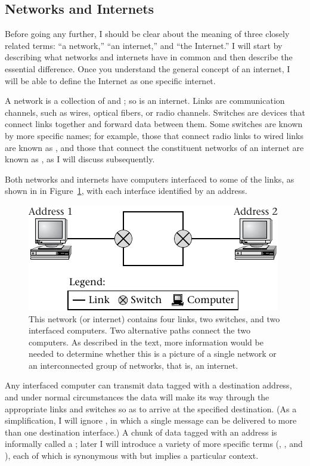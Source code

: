 \subsection{Networks and Internets}\label{networks-and-internets-section}

Before going any further, I should be clear about the meaning of three
closely related terms: ``a network,'' ``an internet,'' and ``the
Internet.''  I will start by describing what networks and internets
have in common and then describe the essential difference.  Once you
understand the general concept of an internet, I will be able to
define the Internet as one specific internet.

A network is a collection of 
and ; so is an internet.  Links are communication channels, such
as wires, optical fibers, or radio channels.  Switches are devices
that connect links together and forward data between them. Some switches are known by more
specific names; for example, those that connect radio links to wired
links are known as , and those that connect the
constituent networks of an internet are known as , as I
will discuss subsequently.

Both networks and internets have computers interfaced to some of the
links, as shown in in Figure~\ref{scan-9-1}, with each
interface identified by an address.
\begin{figure}
\centerline{\includegraphics{hail_f0901}}
\caption{This network (or internet) contains four links, two switches,
  and two interfaced computers.  Two alternative
  paths connect the two computers.  As described in the text, more
  information would be needed to determine whether this is a picture
  of a single network or an interconnected group of networks, that is, an
  internet.}
\label{scan-9-1}
\end{figure}
Any interfaced computer can
transmit data tagged with a destination address, and under normal
circumstances the data will make its way through the appropriate
links and switches so as to arrive at the specified
destination.  (As a simplification, I will ignore ,
in which a single message can be delivered to more than one
destination interface.)  A chunk of data tagged with an address is informally called a ; later I will introduce a variety of more specific terms (, , and ), each of which is synonymous with  but implies a particular context.

